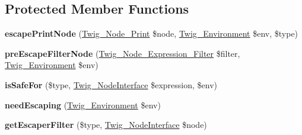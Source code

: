 \subsection*{Protected Member Functions}
\begin{DoxyCompactItemize}
\item 
\hypertarget{class_twig___node_visitor___escaper_aa8c0b3e95013477df545adf86975eeea}{}{\bfseries escape\+Print\+Node} (\hyperlink{class_twig___node___print}{Twig\+\_\+\+Node\+\_\+\+Print} \$node, \hyperlink{class_twig___environment}{Twig\+\_\+\+Environment} \$env, \$type)\label{class_twig___node_visitor___escaper_aa8c0b3e95013477df545adf86975eeea}

\item 
\hypertarget{class_twig___node_visitor___escaper_a733f6ed9e40407782a76a2b7a547297f}{}{\bfseries pre\+Escape\+Filter\+Node} (\hyperlink{class_twig___node___expression___filter}{Twig\+\_\+\+Node\+\_\+\+Expression\+\_\+\+Filter} \$filter, \hyperlink{class_twig___environment}{Twig\+\_\+\+Environment} \$env)\label{class_twig___node_visitor___escaper_a733f6ed9e40407782a76a2b7a547297f}

\item 
\hypertarget{class_twig___node_visitor___escaper_a534f16ca20412d8dc20ed1debaf6fa78}{}{\bfseries is\+Safe\+For} (\$type, \hyperlink{interface_twig___node_interface}{Twig\+\_\+\+Node\+Interface} \$expression, \$env)\label{class_twig___node_visitor___escaper_a534f16ca20412d8dc20ed1debaf6fa78}

\item 
\hypertarget{class_twig___node_visitor___escaper_ab5954ee5479cde965b278d436387e592}{}{\bfseries need\+Escaping} (\hyperlink{class_twig___environment}{Twig\+\_\+\+Environment} \$env)\label{class_twig___node_visitor___escaper_ab5954ee5479cde965b278d436387e592}

\item 
\hypertarget{class_twig___node_visitor___escaper_a2a244aea72aab9d1b6de91ffd4babfaf}{}{\bfseries get\+Escaper\+Filter} (\$type, \hyperlink{interface_twig___node_interface}{Twig\+\_\+\+Node\+Interface} \$node)\label{class_twig___node_visitor___escaper_a2a244aea72aab9d1b6de91ffd4babfaf}

\end{DoxyCompactItemize}

